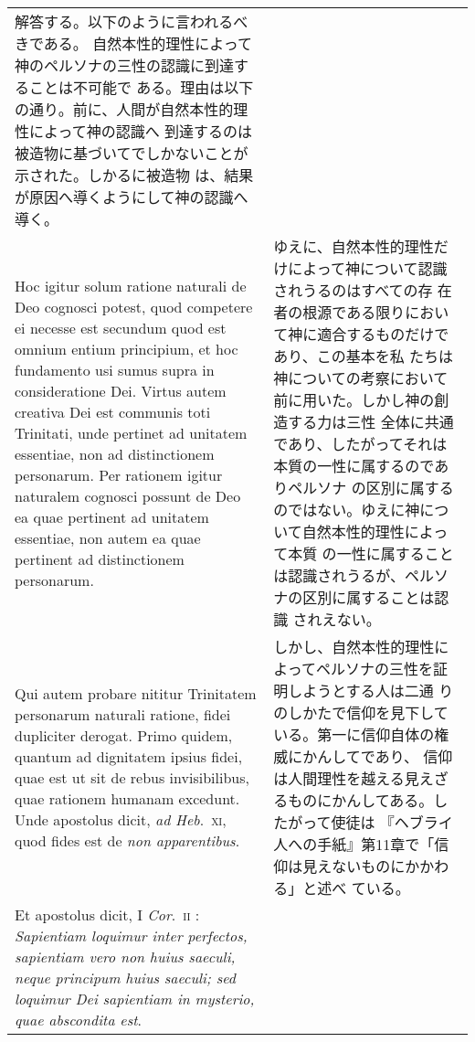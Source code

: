 \documentclass[10pt]{jsarticle} %
\begin{document}
\begin{longtable}{p{21em}p{21em}}
解答する。以下のように言われるべきである。
自然本性的理性によって神のペルソナの三性の認識に到達することは不可能で
 ある。理由は以下の通り。前に、人間が自然本性的理性によって神の認識へ
 到達するのは被造物に基づいてでしかないことが示された。しかるに被造物
 は、結果が原因へ導くようにして神の認識へ導く。




\\


Hoc igitur solum ratione
naturali de Deo cognosci potest, quod competere ei necesse est
secundum quod est omnium entium principium, et hoc fundamento usi
sumus supra in consideratione Dei. Virtus autem creativa Dei est
communis toti Trinitati, unde pertinet ad unitatem essentiae, non ad
distinctionem personarum. Per rationem igitur naturalem cognosci
possunt de Deo ea quae pertinent ad unitatem essentiae, non autem ea
quae pertinent ad distinctionem personarum. 


&

ゆえに、自然本性的理性だけによって神について認識されうるのはすべての存
 在者の根源である限りにおいて神に適合するものだけであり、この基本を私
 たちは神についての考察において前に用いた。しかし神の創造する力は三性
 全体に共通であり、したがってそれは本質の一性に属するのでありペルソナ
 の区別に属するのではない。ゆえに神について自然本性的理性によって本質
 の一性に属することは認識されうるが、ペルソナの区別に属することは認識
 されえない。


\\


Qui autem probare nititur
Trinitatem personarum naturali ratione, fidei dupliciter
derogat. Primo quidem, quantum ad dignitatem ipsius fidei, quae est ut
sit de rebus invisibilibus, quae rationem humanam excedunt. Unde
apostolus dicit, {\itshape ad Heb}.~{\scshape xi}, quod fides est de {\itshape non apparentibus}. 


&

しかし、自然本性的理性によってペルソナの三性を証明しようとする人は二通
 りのしかたで信仰を見下している。第一に信仰自体の権威にかんしてであり、
 信仰は人間理性を越える見えざるものにかんしてある。したがって使徒は
 『ヘブライ人への手紙』第11章で「信仰は見えないものにかかわる」と述べ
 ている。
 



\\


Et apostolus dicit, I {\itshape Cor}.~{\scshape ii} : {\itshape Sapientiam loquimur inter perfectos,
sapientiam vero non huius saeculi, neque principum huius saeculi; sed
loquimur Dei sapientiam in mysterio, quae abscondita est}. 


\end{longtable}
\end{document}
